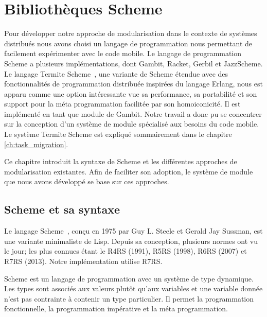 
\chapter{Bibliothèques Scheme}
\label{ch:scheme_concepts}

Pour développer notre approche de modularisation dans le contexte de systèmes
distribués nous avons choisi un langage de programmation nous permettant de
facilement expérimenter avec le code mobile. Le langage de programmation Scheme
a plusieurs implémentations, dont Gambit, Racket\cite{Racket},
Gerbil\cite{Gerbil} et JazzScheme\cite{JazzScheme}.  Le langage Termite
Scheme~\cite{DBLP:conf/erlang/Germain06}, une variante de Scheme étendue avec
des fonctionnalités de programmation distribuée inspirées du langage Erlang,
nous est apparu comme une option intéressante vue sa performance, sa
portabilité et son support pour la méta programmation facilitée par son
homoiconicité. Il est implémenté en tant que module de Gambit. Notre travail a
donc pu se concentrer sur la conception d'un système de module spécialisé aux
besoins du code mobile. Le système Termite Scheme est expliqué sommairement
dans le chapitre \ref{ch:task_migration}.

Ce chapitre introduit la syntaxe de Scheme et les différentes
approches de modularisation existantes.  Afin de faciliter son
adoption, le système de module que nous avons développé se base sur
ces approches.


\section{Scheme et sa syntaxe}

Le langage Scheme~\cite{Clinger:2008:SCH:1529966.1529973}, conçu en 1975 par
Guy L. Steele et Gerald Jay Sussman, est une variante minimaliste de Lisp.
Depuis sa conception, plusieurs normes ont vu le jour; les plus connues étant
le R4RS (1991), R5RS (1998), R6RS (2007) et R7RS (2013). Notre implémentation
utilise R7RS.

Scheme est un langage de programmation avec un
système de type dynamique.  Les types sont associés aux valeurs plutôt qu'aux
variables et une variable donnée n'est pas contrainte à contenir un type
particulier.  Il permet la programmation fonctionnelle, la programmation
impérative et la méta programmation.

